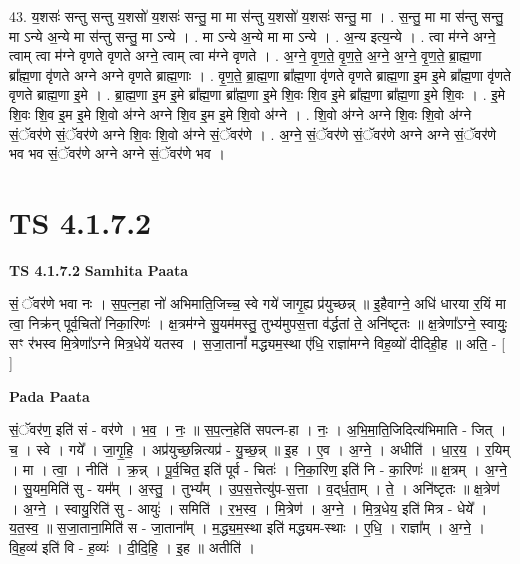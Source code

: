 \documentclass[17pt]{extarticle}
\begin{document}
43. य॒शसः॑ सन्तु सन्तु य॒शसो॑ य॒शसः॑ सन्तु॒ मा मा स॑न्तु य॒शसो॑ य॒शसः॑ सन्तु॒ मा । . स॒न्तु॒ मा मा स॑न्तु सन्तु॒ मा ऽन्ये अ॒न्ये मा स॑न्तु सन्तु॒ मा ऽन्ये । . मा ऽन्ये अ॒न्ये मा मा ऽन्ये । . अ॒न्य इत्य॒न्ये । . त्वा म॑ग्ने अग्ने॒ त्वाम् त्वा म॑ग्ने वृणते वृणते अग्ने॒ त्वाम् त्वा म॑ग्ने वृणते । . अ॒ग्ने॒ वृ॒ण॒ते॒ वृ॒ण॒ते॒ अ॒ग्ने॒ अ॒ग्ने॒ वृ॒ण॒ते॒ ब्रा॒ह्म॒णा ब्रा᳚ह्म॒णा वृ॑णते अग्ने अग्ने वृणते ब्राह्म॒णाः । . वृ॒ण॒ते॒ ब्रा॒ह्म॒णा ब्रा᳚ह्म॒णा वृ॑णते वृणते ब्राह्म॒णा इ॒म इ॒मे ब्रा᳚ह्म॒णा वृ॑णते वृणते ब्राह्म॒णा इ॒मे । . ब्रा॒ह्म॒णा इ॒म इ॒मे ब्रा᳚ह्म॒णा ब्रा᳚ह्म॒णा इ॒मे शि॒वः शि॒व इ॒मे ब्रा᳚ह्म॒णा ब्रा᳚ह्म॒णा इ॒मे शि॒वः । . इ॒मे शि॒वः शि॒व इ॒म इ॒मे शि॒वो अ॑ग्ने अग्ने शि॒व इ॒म इ॒मे शि॒वो अ॑ग्ने । . शि॒वो अ॑ग्ने अग्ने शि॒वः शि॒वो अ॑ग्ने सं॒ॅवर॑णे सं॒ॅवर॑णे अग्ने शि॒वः शि॒वो अ॑ग्ने सं॒ॅवर॑णे । . अ॒ग्ने॒ सं॒ॅवर॑णे सं॒ॅवर॑णे अग्ने अग्ने सं॒ॅवर॑णे भव भव सं॒ॅवर॑णे अग्ने अग्ने सं॒ॅवर॑णे भव । \newline
\pagebreak
{}

\section{ TS 4.1.7.2 }

\textbf{TS 4.1.7.2 } \newline
\textbf{Samhita Paata} \newline

सं॒ ॅवर॑णे भवा नः । स॒प॒त्न॒हा नो॑ अभिमाति॒जिच्च॒ स्वे गये॑ जागृ॒ह्य प्र॑युच्छन्न् ॥ इ॒हैवाग्ने॒ अधि॑ धारया र॒यिं मा त्वा॒ निक्र॑न् पूर्व॒चितो॑ निका॒रिणः॑ । क्ष॒त्रम॑ग्ने सु॒यम॑मस्तु॒ तुभ्य॑मुपस॒त्ता व॑र्द्धतां ते॒ अनि॑ष्टृतः ॥ क्ष॒त्रेणा᳚ऽग्ने॒ स्वायुः॒ सꣳ र॑भस्व मि॒त्रेणा᳚ऽग्ने मित्र॒धेये॑ यतस्व । स॒जा॒तानां᳚ मद्ध्यम॒स्था ए॑धि॒ राज्ञा॑मग्ने विह॒व्यो॑ दीदिही॒ह ॥ अति॒ - [  ] \newline

\textbf{Pada Paata} \newline

सं॒ॅवर॑ण॒ इति॑ सं - वर॑णे । भ॒व॒ । नः॒ ॥ स॒प॒त्न॒हेति॑ सपत्न-हा । नः॒ । अ॒भि॒मा॒ति॒जिदित्य॑भिमाति - जित् । च॒ । स्वे । गये᳚ । जा॒गृ॒हि॒ । अप्र॑युच्छ॒न्नित्यप्र॑ - यु॒च्छ॒न्न् ॥ इ॒ह । ए॒व । अ॒ग्ने॒ । अधीति॑ । धा॒र॒य॒ । र॒यिम् । मा । त्वा॒ । नीति॑ । क्र॒न्न् । पू॒र्व॒चित॒ इति॑ पूर्व - चितः॑ । नि॒का॒रिण॒ इति॑ नि - का॒रिणः॑ ॥ क्ष॒त्रम् । अ॒ग्ने॒ । सु॒यम॒मिति॑ सु - यम᳚म् । अ॒स्तु॒ । तुभ्य᳚म् । उ॒प॒स॒त्तेत्यु॑प-स॒त्ता । व॒द्‌र्ध॒ता॒म् । ते॒ । अनि॑ष्टृतः ॥ क्ष॒त्रेण॑ । अ॒ग्ने॒ । स्वायु॒रिति॑ सु - आयुः॑ । समिति॑ । र॒भ॒स्व॒ । मि॒त्रेण॑ । अ॒ग्ने॒ । मि॒त्र॒धेय॒ इति॑ मित्र - धेये᳚ । य॒त॒स्व॒ ॥ स॒जा॒ताना॒मिति॑ स - जा॒ताना᳚म् । म॒द्ध्य॒म॒स्था इति॑ मद्ध्यम-स्थाः । ए॒धि॒ । राज्ञा᳚म् । अ॒ग्ने॒ । वि॒ह॒व्य॑ इति॑ वि - ह॒व्यः॑ । दी॒दि॒हि॒ । इ॒ह ॥ अतीति॑ ।  \newline
\end{document}

